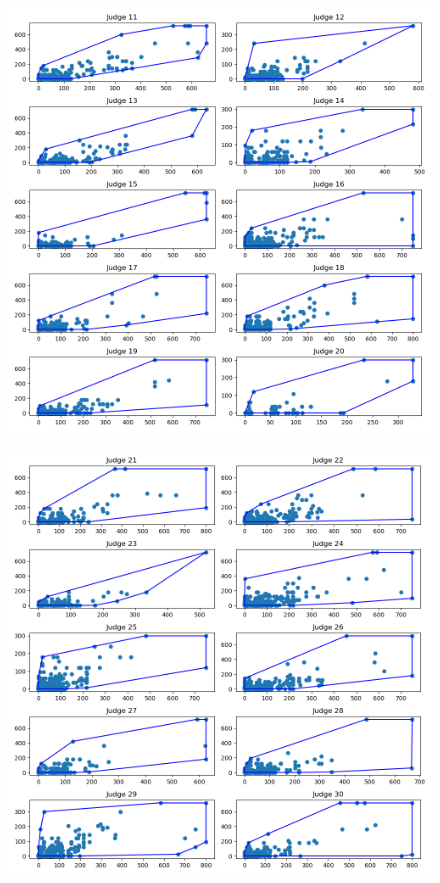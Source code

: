 \documentclass[11pt, oneside]{article}   	%
\theoremstyle{ModifiedStyle}
\begin{document}
	\begin{figure}[H]
		\centering
		\includegraphics[width=\textwidth]{../../output/figures/Exploration/judge_convex_hulls_1.png}
	\end{figure}

	\begin{figure}[H]
		\centering
		\includegraphics[width=\textwidth]{../../output/figures/Exploration/judge_convex_hulls_2.png}
	\end{figure}
\end{document}
